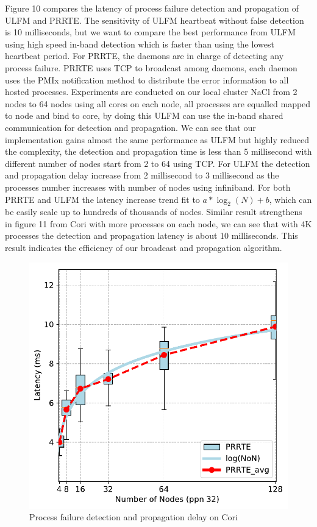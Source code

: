 \documentclass[sigconf]{acmart}
\begin{document}
Figure 10 compares the latency of process failure detection and propagation of ULFM and PRRTE. The sensitivity of ULFM heartbeat without false detection is 10 milliseconds, but we want to compare the best performance from ULFM using high speed in-band detection which is faster than using the lowest heartbeat period. For PRRTE, the daemons are in charge of detecting any process failure. PRRTE uses TCP to broadcast among daemons, each daemon uses the PMIx notification method to distribute the error information to all hosted processes. Experiments are conducted on our local cluster NaCl from 2 nodes to 64 nodes using all cores on each node, all processes are equalled mapped to node and bind to core, by doing this ULFM can use the in-band shared communication for detection and propagation. We can see that our implementation gains almost the same performance as ULFM but highly reduced the complexity, the detection and propagation time is less than 5 millisecond with different number of nodes start from 2 to 64 using TCP. For ULFM the detection and propagation delay increase from 2 millisecond to 3 millisecond as the processes number increases with number of nodes using infiniband. For both PRRTE and ULFM the latency increase trend fit to $ a*\log_2(N) + b $, which can be easily scale up to hundreds of thousands of nodes. Similar result strengthens in figure 11 from Cori with more processes on each node, we can see that with 4K processes the detection and propagation latency is about 10 milliseconds. This result indicates the efficiency of our broadcast and propagation algorithm.  

\begin{figure}[h]
  \centering
  \includegraphics[width=\linewidth]{Cori_Process_Failure_fit.pdf}
  \caption{Process failure detection and propagation delay on Cori}
\end{figure}
\end{document}
